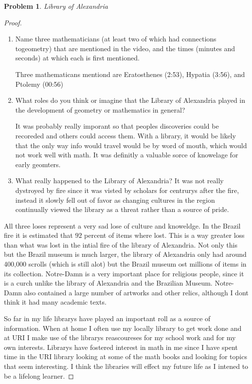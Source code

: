 \documentclass{article}
\newtheorem{prb}{Problem}
\begin{document}
\begin{prb} Library of Alexandria  \end{prb} 
\begin{proof} 
	\begin{enumerate}
	\item Name three mathematicians (at least two of which had connections togeometry) that are mentioned in the video, and the times (minutes and
		seconds) at which each is first mentioned.

		Three mathematicans mentiond are Eratosthenes (2:53), Hypatia (3:56), and Ptolemy (00:56)
	\item What roles do you think or imagine that the Library of Alexandria played
		in the development of geometry or mathematics in general?

		It was probably really imporant so that peoples discoveries could be recoreded and others could access them. With a library, 
		it would be likely that the only way info would travel would be by word of mouth, which would not work well with math. It was definitly 
		a valuable sorce of knowelage for early geomters. 
	\item What really happened to the Library of Alexandria?
		It was not really dystroyed by fire since it was visted by scholars for centrurys after the fire, instead it slowly fell out of 
		favor as changing cultures in the region continually viewed the library as a threat rather than a source of pride. 

	\end{enumerate}

	\medskip 

	\medskip 

	All three loses represent a very sad lose of culture and knoweldge. In the Brazil fire it is estimated that $92$ percent of items where lost. 
	This is a way greater loss than what was lost in the intial fire of the library of Alexandria. Not only this but the Brazil  museum is much larger, 
	the library of Alexandria only had around 400,000 scrolls (which is still alot) but the Brazil museum ost millions of items in its collection. 
	Notre-Damn is a very important place for religious people, since it is a curch unlike the library of Alexandria and the Brazilian Museum. Notre-Damn 
	also contained a large number of artworks and other relics, although I dont think it had many academic texts. 

	\medskip 

	So far in my life librarys have played an important roll as a source of information. When at home I often use my locally library to get work done 
	and at URI I make use of the librarys reascoureses for my school work and for my own interests. Librarys have fostered interest in math in me since I have spent time in the URI library looking at some of the math books and looking for topics that seem interesting. I think the libraries will effect my future life as I intened to be a lifelong learner. 

\end{proof} 
\end{document}
